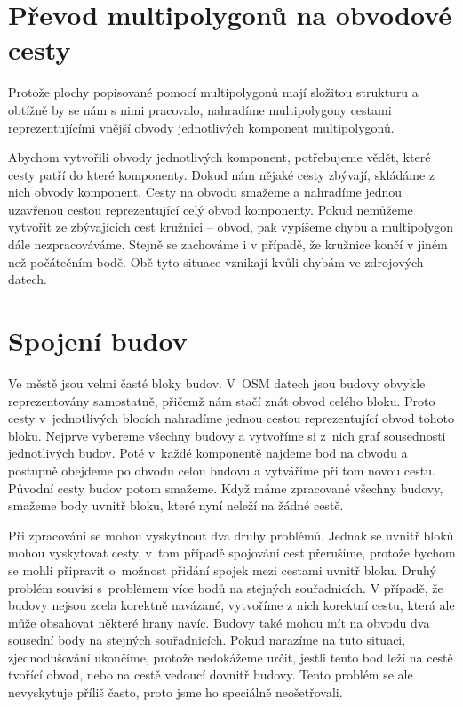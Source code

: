 \section{Převod multipolygonů na obvodové cesty}
Protože plochy popisované pomocí multipolygonů mají složitou strukturu a obtížně
by se nám s nimi pracovalo, nahradíme multipolygony cestami reprezentujícími
vnější obvody jednotlivých komponent multipolygonů.

Abychom vytvořili obvody jednotlivých komponent, potřebujeme vědět, které cesty
patří do které komponenty.  Dokud nám nějaké cesty zbývají, skládáme z nich
obvody komponent. Cesty na obvodu smažeme a nahradíme jednou uzavřenou cestou
reprezentující celý obvod komponenty. Pokud nemůžeme vytvořit ze zbývajících
cest kružnici -- obvod, pak vypíšeme chybu a multipolygon dále nezpracováváme.
Stejně se zachováme i v případě, že kružnice končí v jiném než počátečním bodě.
Obě tyto situace vznikají kvůli chybám ve zdrojových datech.

\section{Spojení budov}
Ve městě jsou velmi časté bloky budov. V~OSM datech jsou budovy obvykle reprezentovány
samostatně, přičemž nám stačí znát obvod celého bloku. Proto cesty
v~jednotlivých blocích nahradíme jednou cestou reprezentující obvod tohoto bloku.
Nejprve vybereme všechny budovy a vytvoříme si z~nich graf sousednosti
jednotlivých budov. Poté v~každé komponentě najdeme bod na obvodu a postupně
obejdeme po obvodu celou budovu a vytváříme při tom novou cestu. Původní
cesty budov potom smažeme. Když máme zpracované všechny budovy, smažeme body uvnitř
bloku, které nyní neleží na žádné cestě.

Při zpracování se mohou vyskytnout dva druhy problémů. Jednak se uvnitř bloků
mohou vyskytovat cesty, v~tom případě spojování cest přerušíme, protože bychom
se mohli připravit o~možnost přidání spojek mezi cestami uvnitř bloku. Druhý
problém souvisí s~problémem více bodů na stejných souřadnicích. V případě, že
budovy nejsou zcela korektně navázané, vytvoříme z nich korektní cestu, která
ale může obsahovat některé hrany navíc. Budovy také mohou mít na obvodu dva sousední body
na stejných souřadnicích. Pokud narazíme na tuto situaci, zjednodušování
ukončíme, protože nedokážeme určit, jestli tento bod leží na cestě tvořící
obvod, nebo na cestě vedoucí dovnitř budovy. Tento problém se ale nevyskytuje
příliš často, proto jsme ho speciálně neošetřovali.

